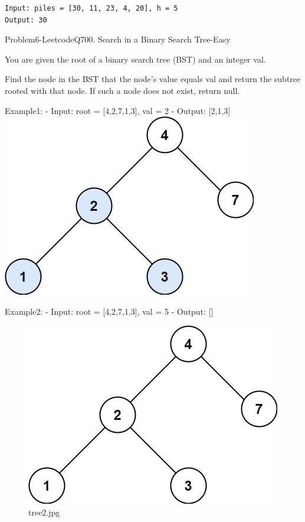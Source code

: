 \documentclass[11pt]{article}
\begin{document}
    \begin{Verbatim}[commandchars=\\\{\}]
Input: piles = [30, 11, 23, 4, 20], h = 5
Output: 30
    \end{Verbatim}

    Problem6-LeetcodeQ700. Search in a Binary Search Tree-Easy

You are given the root of a binary search tree (BST) and an integer val.

Find the node in the BST that the node's value equals val and return the
subtree rooted with that node. If such a node does not exist, return
null.

Example1: - Input: root = {[}4,2,7,1,3{]}, val = 2 - Output: {[}2,1,3{]}
\includegraphics{af646e3b-a5bd-4985-9c3a-90586d7aa840.jpg}

Example2: - Input: root = {[}4,2,7,1,3{]}, val = 5 - Output: {[}{]}

\begin{figure}
\centering
\includegraphics{9835ab4a-b937-44b0-9b2c-e293184f301e.jpg}
\caption{tree2.jpg}
\end{figure}
\end{document}
